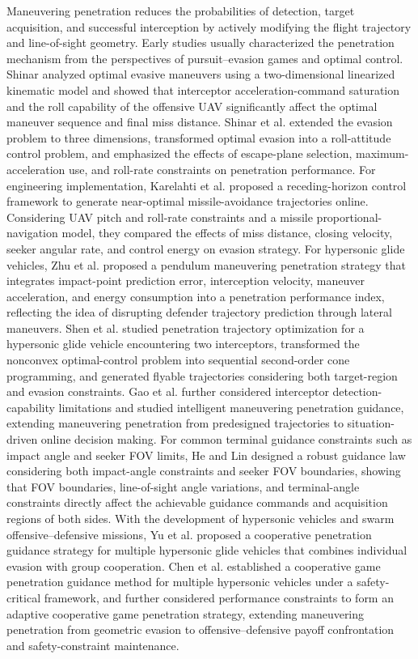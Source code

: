 \documentclass[unbranded]{cja}
\begin{document}
Maneuvering penetration reduces the probabilities of detection, target acquisition, and successful interception by actively modifying the flight trajectory and line-of-sight geometry. Early studies usually characterized the penetration mechanism from the perspectives of pursuit--evasion games and optimal control. Shinar\cite{Shinar1977JA} analyzed optimal evasive maneuvers using a two-dimensional linearized kinematic model and showed that interceptor acceleration-command saturation and the roll capability of the offensive UAV significantly affect the optimal maneuver sequence and final miss distance. Shinar et al.\cite{Shinar1979JGC} extended the evasion problem to three dimensions, transformed optimal evasion into a roll-attitude control problem, and emphasized the effects of escape-plane selection, maximum-acceleration use, and roll-rate constraints on penetration performance. For engineering implementation, Karelahti et al.\cite{Karelahti2007JGCD} proposed a receding-horizon control framework to generate near-optimal missile-avoidance trajectories online. Considering UAV pitch and roll-rate constraints and a missile proportional-navigation model, they compared the effects of miss distance, closing velocity, seeker angular rate, and control energy on evasion strategy. For hypersonic glide vehicles, Zhu et al.\cite{Zhu2018AST} proposed a pendulum maneuvering penetration strategy that integrates impact-point prediction error, interception velocity, maneuver acceleration, and energy consumption into a penetration performance index, reflecting the idea of disrupting defender trajectory prediction through lateral maneuvers. Shen et al.\cite{Shen2022AST} studied penetration trajectory optimization for a hypersonic glide vehicle encountering two interceptors, transformed the nonconvex optimal-control problem into sequential second-order cone programming, and generated flyable trajectories considering both target-region and evasion constraints. Gao et al.\cite{Gao2025AAS} further considered interceptor detection-capability limitations and studied intelligent maneuvering penetration guidance, extending maneuvering penetration from predesigned trajectories to situation-driven online decision making. For common terminal guidance constraints such as impact angle and seeker FOV limits, He and Lin\cite{He2015FOV} designed a robust guidance law considering both impact-angle constraints and seeker FOV boundaries, showing that FOV boundaries, line-of-sight angle variations, and terminal-angle constraints directly affect the achievable guidance commands and acquisition regions of both sides. With the development of hypersonic vehicles and swarm offensive--defensive missions, Yu et al.\cite{Yu2020CJA} proposed a cooperative penetration guidance strategy for multiple hypersonic glide vehicles that combines individual evasion with group cooperation. Chen et al.\cite{Chen2024CJA} established a cooperative game penetration guidance method for multiple hypersonic vehicles under a safety-critical framework, and further considered performance constraints to form an adaptive cooperative game penetration strategy\cite{Chen2024TAES}, extending maneuvering penetration from geometric evasion to offensive--defensive payoff confrontation and safety-constraint maintenance.
\end{document}
